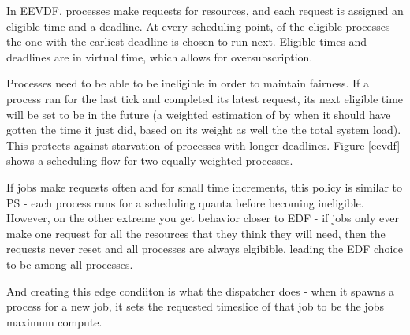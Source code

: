In EEVDF, processes make requests for resources, and each request is assigned an
eligible time and a deadline. At every scheduling point, of the eligible
processes the one with the earliest deadline is chosen to run next. Eligible
times and deadlines are in virtual time, which allows for oversubscription. 

Processes need to be able to be ineligible in order to maintain fairness. If a
process ran for the last tick and completed its latest request, its next
eligible time will be set to be in the future (a weighted estimation of by when
it should have gotten the time it just did, based on its weight as well the the
total system load). This protects against starvation of processes with longer
deadlines. Figure \ref{eevdf} shows a scheduling flow for two equally weighted
processes.

If jobs make requests often and for small time increments, this policy is
similar to PS - each process runs for a scheduling quanta before becoming
ineligible. However, on the other extreme you get behavior closer to EDF - if
jobs only ever make one request for all the resources that they think they will
need, then the requests never reset and all processes are always elgibible,
leading the EDF choice to be among all processes.

And creating this edge condiiton is what the dispatcher does - when it spawns a
process for a new job, it sets the requested timeslice of that job to be the
jobs maximum compute. 

